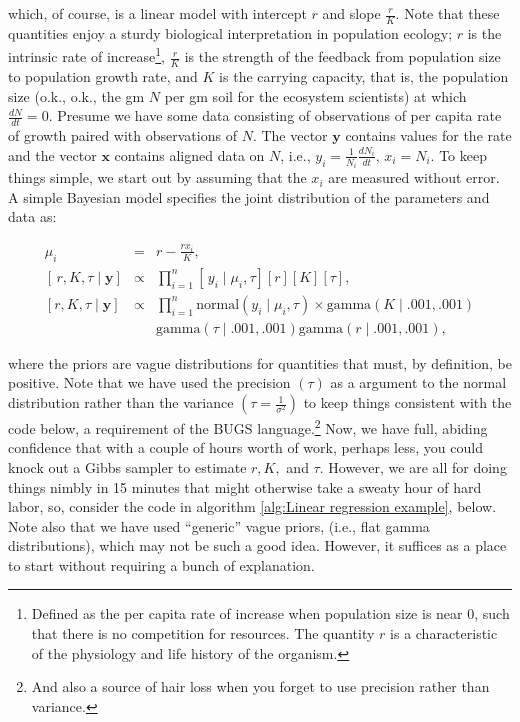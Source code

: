 \documentclass[12pt,english]{article}
\begin{document}
\noindent which, of course, is a linear model with intercept $r$ and slope $\frac{r}{K}$. Note that these quantities enjoy a sturdy biological interpretation in population ecology; $r$ is the intrinsic rate of increase\footnote{Defined as the per capita rate of increase when population size is near 0, such that there is no competition for resources. The quantity $r$ is a characteristic of the physiology and life history of the organism.}, $\frac{r}{K}$ is the strength of the feedback from population size to population growth rate, and $K$ is the carrying capacity, that is, the population size (o.k., o.k., the gm $N$ per gm soil for the ecosystem scientists) at which $\frac{}{}$$\frac{dN}{dt}=0$. Presume we have some data consisting of observations of per capita rate of growth paired with observations of $N$. The vector $\mathbf{y}$ contains values for the rate and the vector $\mathbf{x}$ contains aligned data on $N$, i.e., $y_{i}=\frac{1}{N_{i}}\frac{dN_{i}}{dt},\, x_{i}=N_{i}$. To keep things simple, we start out by assuming that the $x_{i}$ are measured without error. A simple Bayesian model specifies the joint distribution of the parameters and data as: 

\begin{eqnarray}
\mu_{i} & = & r-\frac{rx_{i}}{K}\textrm{,}\\
\left[\,r,K,\tau\mid\mathbf{y}\right] & \propto & \prod_{i=1}^{n}\left[\,y_{i}\mid\mu_{i},\tau\right]\left[r\right]\left[K\right]\left[\tau\right]\textrm{,}\nonumber \\
\left[r,K,\tau\mid\mathbf{y}\right] & \propto & \prod_{i=1}^{n}\textrm{normal}\left(y_{i}\mid\mu_{i},\tau\right)\times\label{eq:conditional} \textrm{gamma}\left(K\mid.001,.001\right)\\
 &  &\textrm{gamma}\left(\tau\mid.001,.001\right)\textrm{gamma}\left(r\mid.001,.001\right),\nonumber 
\end{eqnarray}

\noindent where the priors are vague distributions for quantities that must, by definition, be positive. Note that we have used the precision $(\tau)$ as a argument to the normal distribution rather than the variance $\left(\tau=\frac{1}{\sigma^{2}}\right)$ to keep things consistent with the code below, a requirement of the BUGS language.\footnote{And also a source of hair loss when you forget to use precision rather than variance.} Now, we have full, abiding confidence that with a couple of hours worth of work, perhaps less, you could knock out a Gibbs sampler to estimate $r,K,$ and $\tau$. However, we are all for doing things nimbly in 15 minutes that might otherwise take a sweaty hour of hard labor, so, consider the code in algorithm \ref{alg:Linear regression example}, below. Note also that we have used \enquote{generic} vague priors, (i.e., flat gamma distributions), which may not be such a good idea. However, it suffices as a place to start without requiring a bunch of explanation.
\end{document}
